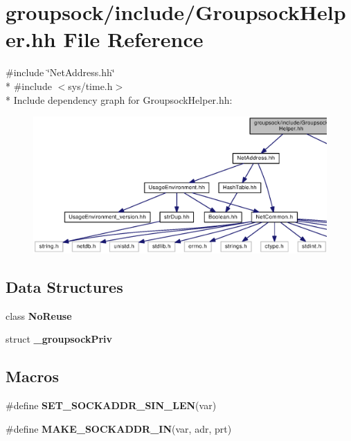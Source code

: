 \section{groupsock/include/\+Groupsock\+Helper.hh File Reference}
\label{GroupsockHelper_8hh}
{\ttfamily \#include \char`\"{}Net\+Address.\+hh\char`\"{}}\\*
{\ttfamily \#include $<$sys/time.\+h$>$}\\*
Include dependency graph for Groupsock\+Helper.\+hh\+:
\nopagebreak
\begin{figure}[H]
\begin{center}
\leavevmode
\includegraphics[width=350pt]{GroupsockHelper_8hh__incl}
\end{center}
\end{figure}
\subsection*{Data Structures}
\begin{DoxyCompactItemize}
\item 
class {\bf No\+Reuse}
\item 
struct {\bf \+\_\+groupsock\+Priv}
\end{DoxyCompactItemize}
\subsection*{Macros}
\begin{DoxyCompactItemize}
\item 
\#define {\bf S\+E\+T\+\_\+\+S\+O\+C\+K\+A\+D\+D\+R\+\_\+\+S\+I\+N\+\_\+\+L\+E\+N}(var)
\item 
\#define {\bf M\+A\+K\+E\+\_\+\+S\+O\+C\+K\+A\+D\+D\+R\+\_\+\+I\+N}(var,  adr,  prt)
\end{DoxyCompactItemize}
